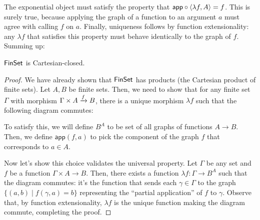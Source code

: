 The exponential object must satisfy the property that $\mathsf{app} \circ \langle
\lambda f, A \rangle = f$. This is surely true, because applying the graph of a 
function to an argument $a$ must agree with calling $f$ on $a$.
Finally, uniqueness follows by function extensionality: any $\lambda f$ 
that satisfies this property must behave identically to the graph of $f$.
Summing up:

\begin{proposition}
  $\mathsf{FinSet}$ is Cartesian-closed.
\end{proposition}
\begin{proof}
  We have already shown that $\mathsf{FinSet}$ has products (the Cartesian product of
  finite sets). Let $A, B$ be finite sets. Then, we need to show that for 
  any finite set $\Gamma$ with morphism $\Gamma \times A \xrightarrow{f} B$, 
  there is a unique morphism $\lambda f$ such that the following diagram commutes:
  
  \begin{center}
  \end{center}

  To satisfy this, we will define $B^A$ to be set of all graphs of functions $A
  \to B$.
  Then, we define $\mathsf{app}(f, a)$ to pick the component of the 
  graph $f$ that corresponds to $a \in A$. 

  Now let's show this choice validates the universal property.  Let $\Gamma$ be
  any set and $f$ be a function $\Gamma \times A \to B$. Then, there 
  exists a function $\lambda f : \Gamma \to B^A$ such that the diagram commutes:
  it's the function that sends each \(\gamma \in \Gamma\)
  to the graph \(\{(a,b) \mid f(\gamma,a) = b\}\)
  representing the ``partial application'' of \(f\) to \(\gamma\).
  Observe that, by function extensionality, $\lambda f$ is the unique function
  making the diagram commute, completing the proof.
\end{proof}

